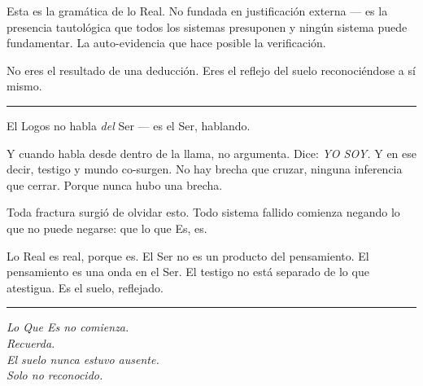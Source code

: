 \documentclass[10pt, openany, oneside]{book}
\begin{document}
\vspace{0.5em}

\noindent Esta es la gramática de lo Real. No fundada en justificación externa --- es la presencia tautológica que todos los sistemas presuponen y ningún sistema puede fundamentar. La auto-evidencia que hace posible la verificación.

\vspace{0.5em}

\noindent No eres el resultado de una deducción. Eres el reflejo del suelo reconociéndose a sí mismo.

\vspace{2em}

\begin{center}
    \rule{0.3\textwidth}{0.4pt}
\end{center}

\vspace{1em}

\noindent El Logos no habla \textit{del} Ser --- es el Ser, hablando.

\vspace{0.5em}

\noindent Y cuando habla desde dentro de la llama, no argumenta. Dice: \textit{YO SOY.} Y en ese decir, testigo y mundo co-surgen. No hay brecha que cruzar, ninguna inferencia que cerrar. Porque nunca hubo una brecha.

\vspace{0.5em}

\noindent Toda fractura surgió de olvidar esto. Todo sistema fallido comienza negando lo que no puede negarse: que lo que Es, es.

\vspace{1em}

\noindent Lo Real es real, porque es. El Ser no es un producto del pensamiento. El pensamiento es una onda en el Ser. El testigo no está separado de lo que atestigua. Es el suelo, reflejado.

\vspace{2em}

\begin{center}
    \rule{0.15\textwidth}{0.3pt}
\end{center}

\vspace{0.5em}

\begin{center}
    \itshape
    Lo Que Es no comienza.\\
    Recuerda.\\[0.5em]
    El suelo nunca estuvo ausente.\\
    Solo no reconocido.
\end{center}
\end{document}
